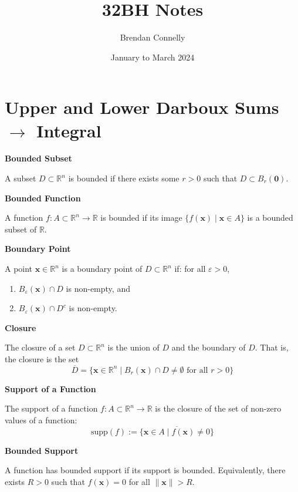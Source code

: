 \documentclass{article}
\title{32BH Notes}
\author{Brendan Connelly}
\date{January to March 2024}
\newcommand{\R}{\mathbb{R}}
\newenvironment{definition}[1]{
    \par\noindent\textbf{#1}\par\noindent
}{
    \par \vspace{0.5cm}
}
\begin{document}
\maketitle

\section*{Upper and Lower Darboux Sums $\rightarrow$ Integral}

\begin{definition}{Bounded Subset}
    A subset \( D \subset \R^n \) is bounded if there exists some \( r > 0 \) such that \( D \subset B_r(\bm{0}) \).
\end{definition}


\begin{definition}{Bounded Function}
    A function \( f : A \subset \R^n \to \R \) is bounded if its image \(\{f(\bm{x}) \mid \bm{x} \in A\}\)
    is a bounded subset of \(\R\).
\end{definition}


\begin{definition}{Boundary Point}
    A point \( \bm{x} \in \R^n \) is a boundary point of \( D \subset \R^n \) if: for all \( \varepsilon > 0 \),
    \begin{enumerate}
        \item \( B_{\varepsilon}(\bm{x}) \cap D \) is non-empty, and
        \item \( B_{\varepsilon}(\bm{x}) \cap D^c \) is non-empty.
    \end{enumerate}
\end{definition}

\begin{definition}{Closure}
    The closure of a set \( D \subset \R^n \) is the union of \( D \) and the boundary of \( D \).
    That is, the closure is the set
    \[ \overline{D} = \{\bm{x} \in \R^n \mid B_r(\bm{x}) \cap D \neq \emptyset \text{ for all } r > 0 \} \]
\end{definition}


\begin{definition}{Support of a Function}
    The support of a function \( f : A \subset \R^n \to \R \) is the closure of the set of
    non-zero values of a function:
    \[ \text{supp}(f) := \overline{\{\bm{x} \in A \mid f(\bm{x}) \neq 0\}} \]
\end{definition}


\begin{definition}{Bounded Support}
    A function has bounded support if its support is bounded. Equivalently, there exists \( R > 0 \) such that \( f(\bm{x}) = 0 \) for all \( \|\bm{x}\| > R \).
\end{definition}
\end{document}
